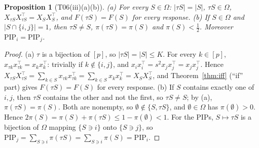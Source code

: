 \documentclass[11pt]{article}
\newtheorem{proposition}[theorem]{Proposition}
\theoremstyle{remark}
\newcommand{\PIP}{\mathrm{PIP}}
\begin{document}
\begin{proposition}[T06(iii)(a)(b)]\label{prop:dup}
(a) For every $S\in\Omega$: $|\tau S|=|S|$, $\tau S\in\Omega$, $X_{\tau S}X_{\tau S}^\top=X_SX_S^\top$, and $F(\tau S)=F(S)$ for every response.
(b) If $S\in\Omega$ and $|S\cap\{i,j\}|=1$, then $\tau S\ne S$, $\pi(\tau S)=\pi(S)$ and $\pi(S)<\tfrac12$. Moreover $\PIP_i=\PIP_j$.
\end{proposition}
\begin{proof}
(a) $\tau$ is a bijection of $[p]$, so $|\tau S|=|S|\le K$. For every $k\in[p]$, $x_{\tau k}x_{\tau k}^\top=x_kx_k^\top$: trivially if $k\notin\{i,j\}$, and $x_ix_i^\top=s^2x_jx_j^\top=x_jx_j^\top$. Hence $X_{\tau S}X_{\tau S}^\top=\sum_{k\in S}x_{\tau k}x_{\tau k}^\top=\sum_{k\in S}x_kx_k^\top=X_SX_S^\top$, and Theorem~\ref{thm:iff} (``if'' part) gives $F(\tau S)=F(S)$ for every response.
(b) If $S$ contains exactly one of $i,j$, then $\tau S$ contains the other and not the first, so $\tau S\ne S$; by (a), $\pi(\tau S)=\pi(S)$. Both are nonempty, so $\emptyset\notin\{S,\tau S\}$, and $\emptyset\in\Omega$ has $\pi(\emptyset)>0$. Hence $2\pi(S)=\pi(S)+\pi(\tau S)\le1-\pi(\emptyset)<1$. For the PIPs, $S\mapsto\tau S$ is a bijection of $\Omega$ mapping $\{S\ni i\}$ onto $\{S\ni j\}$, so $\PIP_j=\sum_{S\ni i}\pi(\tau S)=\sum_{S\ni i}\pi(S)=\PIP_i$.
\end{proof}
\end{document}
